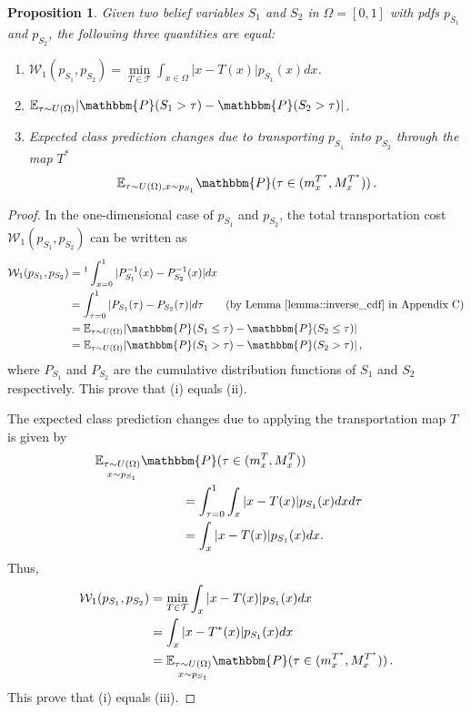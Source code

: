 \documentclass[letterpaper]{article}
\newtheorem{proposition}{Proposition}
\theoremstyle{definition}
\newcommand{\W}{\mathcal{W}}
\begin{document}
\begin{proposition}
Given two belief variables $S_1$ and $S_2$ in $\Omega=[0,1]$ with pdfs $p_{S_1}$ and $p_{S_2}$, the following three quantities are equal:
\begin{enumerate}
\item[\emph{(i)}] $\W_1(p_{S_1}, p_{S_2}) = \min\limits_{T\in\mathcal{T}} \int_{x\in\Omega} |x-T(x)|p_{S_1}(x)dx$.
\item[\emph{(ii)}]
$\mathbb{E}_{\tau\sim U(\Omega)} |\mathbbm{P}(S_1>\tau) - \mathbbm{P}(S_2 > \tau)|$.
\item[\emph{(iii)}] Expected class prediction changes due to transporting $p_{S_1}$ into $p_{S_2}$ through the map $T^*$ \[\mathbb{E}_{\tau\sim U(\Omega), x\sim p_{S_1}} \mathbbm{P}(\tau\in(m_x^{T^*}, M_x^{T^*}))\,.\] 
\end{enumerate}
\label{prop:1}
\end{proposition}
\begin{proof}
In the one-dimensional case of $p_{S_1}$ and $p_{S_2}$, the total transportation cost $\W_1(p_{S_1}, p_{S_2})$ can be written as 
\begin{align*}
\W_1(p_{S_1}, p_{S_2}) &=\text{\footnotemark} \int_{x=0}^1 |P_{S_1}^{-1}(x) - P_{S_2}^{-1}(x)|dx \\
&=\int_{\tau=0}^1 |P_{S_1}(\tau) - P_{S_2}(\tau)|d\tau \tag*{(by Lemma~\ref{lemma::inverse_cdf} in Appendix C)}\\
&= \mathbb{E}_{\tau\sim U(\Omega)} |\mathbbm{P}(S_1\leq \tau) - \mathbbm{P}(S_2 \leq \tau)|\\
&= \mathbb{E}_{\tau\sim U(\Omega)} |\mathbbm{P}(S_1>\tau) - \mathbbm{P}(S_2 > \tau)|\,,    
\end{align*}
where $P_{S_1}$ and $P_{S_2}$ are the cumulative distribution functions of $S_1$ and $S_2$ respectively. This prove that (i) equals (ii).

The expected class prediction changes due to applying the transportation map $T$ is given by
\begin{align*}
&\hskip-0.4cm\mathbb{E}_{\substack{\tau\sim U(\Omega)\\[2pt] x\sim p_{S_1}}} \mathbbm{P}(\tau\in(m_x^T, M_x^T))\nonumber\\
& \hskip2cm = \int_{\tau=0}^1 \int_x |x-T(x)|p_{S_1}(x)dx d\tau \nonumber\\
& \hskip2cm = \int_x |x-T(x)|p_{S_1}(x)dx. %
\end{align*}
Thus, 
\begin{align*}
\hskip-0.0cm\W_1(p_{S_1}, p_{S_2}) &= \min_{T\in\mathcal{T}} \int_x |x-T(x)|p_{S_1}(x)dx \\
&\hskip-0.0cm=\int_x |x-T^*(x)|p_{S_1}(x)dx \\
&\hskip-0.0cm =\mathbb{E}_{\substack{\tau\sim U(\Omega)\\[2pt] x\sim p_{S_1}}} \mathbbm{P}(\tau\in(m_x^{T^*}, M_x^{T^*}))\,.
\end{align*}
This prove that (i) equals (iii).
\end{proof}
\end{document}
